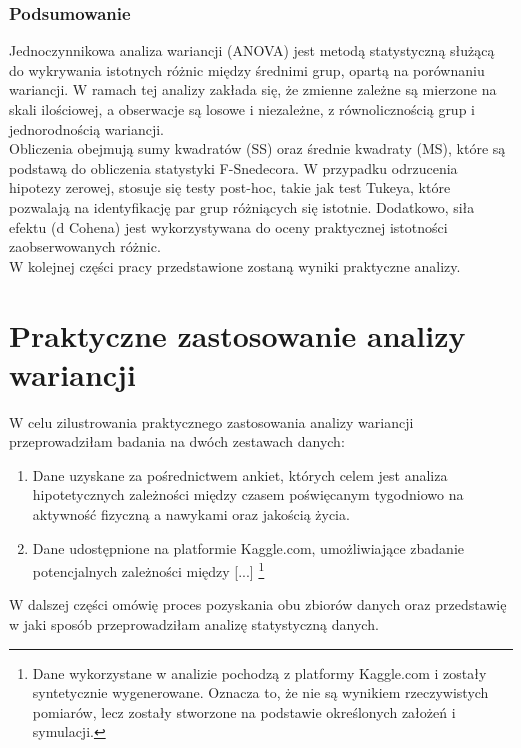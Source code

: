 \documentclass[12pt,a4paper]{article}
\begin{document}
\subsubsection{Podsumowanie}
Jednoczynnikowa analiza wariancji (ANOVA) jest metodą statystyczną służącą do wykrywania istotnych różnic między średnimi grup, opartą na porównaniu wariancji. W ramach tej analizy zakłada się, że zmienne zależne są mierzone na skali ilościowej, a obserwacje są losowe i niezależne, z równolicznością grup i jednorodnością wariancji. \\

Obliczenia obejmują sumy kwadratów (SS) oraz średnie kwadraty (MS), które są podstawą do obliczenia statystyki F-Snedecora. W przypadku odrzucenia hipotezy zerowej, stosuje się testy post-hoc, takie jak test Tukeya, które pozwalają na identyfikację par grup różniących się istotnie. Dodatkowo, siła efektu (d Cohena) jest wykorzystywana do oceny praktycznej istotności zaobserwowanych różnic. \\

W kolejnej części pracy przedstawione zostaną wyniki praktyczne analizy.




\newpage
\section{Praktyczne zastosowanie analizy wariancji}
W celu zilustrowania praktycznego zastosowania analizy wariancji przeprowadziłam badania na dwóch zestawach danych:

\begin{enumerate}
    \item Dane uzyskane za pośrednictwem ankiet, których celem jest analiza hipotetycznych zależności między czasem poświęcanym tygodniowo na aktywność fizyczną a nawykami oraz jakością życia.
    \item Dane udostępnione na platformie Kaggle.com, umożliwiające zbadanie potencjalnych zależności między [...] \footnote{Dane wykorzystane w analizie pochodzą z platformy Kaggle.com i zostały syntetycznie wygenerowane. Oznacza to, że nie są wynikiem rzeczywistych pomiarów, lecz zostały stworzone na podstawie określonych założeń i symulacji.}
\end{enumerate}
W dalszej części omówię proces pozyskania obu zbiorów danych oraz przedstawię w jaki sposób przeprowadziłam analizę statystyczną danych.
\end{document}
